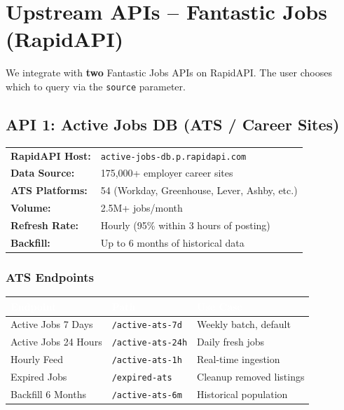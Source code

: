 \documentclass[11pt, a4paper]{article}
\begin{document}
\newpage
\section{Upstream APIs -- Fantastic Jobs (RapidAPI)}

We integrate with \textbf{two} Fantastic Jobs APIs on RapidAPI. The user chooses which to query via the \texttt{source} parameter.

\subsection{API 1: Active Jobs DB (ATS / Career Sites)}

\begin{infobox}
\small
\begin{tabular}{@{}l@{\hspace{1em}}l@{}}
    \textbf{RapidAPI Host:} & \texttt{active-jobs-db.p.rapidapi.com} \\
    \textbf{Data Source:} & 175,000+ employer career sites \\
    \textbf{ATS Platforms:} & 54 (Workday, Greenhouse, Lever, Ashby, etc.) \\
    \textbf{Volume:} & 2.5M+ jobs/month \\
    \textbf{Refresh Rate:} & Hourly (95\% within 3 hours of posting) \\
    \textbf{Backfill:} & Up to 6 months of historical data \\
\end{tabular}
\end{infobox}

\subsubsection{ATS Endpoints}

\begin{center}\small
\begin{tabularx}{\textwidth}{|L{3.5cm}|L{3.5cm}|X|}
\hline
{}
\textcolor{white}{\textbf{Endpoint}} & \textcolor{white}{\textbf{Path}} & \textcolor{white}{\textbf{Use Case}} \\
\hline
Active Jobs 7 Days & \texttt{/active-ats-7d} & Weekly batch, default \\
Active Jobs 24 Hours & \texttt{/active-ats-24h} & Daily fresh jobs \\
Hourly Feed & \texttt{/active-ats-1h} & Real-time ingestion \\
Expired Jobs & \texttt{/expired-ats} & Cleanup removed listings \\
Backfill 6 Months & \texttt{/active-ats-6m} & Historical population \\
\hline
\end{tabularx}
\end{center}
\end{document}
